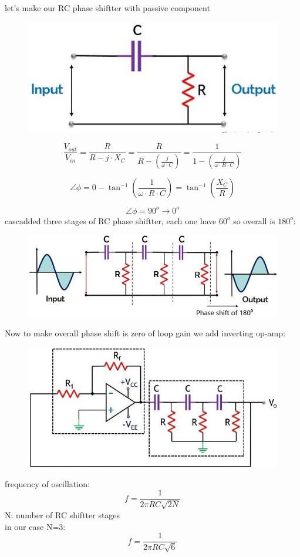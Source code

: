 \documentclass{article}
\begin{document}
let's make our RC phase shiftter with passive component

\begin{figure}[h]
    \centering
    \includegraphics[width=.4\textwidth]{RC_phasse_shift.jpg}
\end{figure}
\[
\frac{V_{out}}{V_{in}} = \frac{R}{R - j \cdot X_C} = \frac{R}{R - \left( \frac{j}{\omega \cdot C} \right)} = \frac{1}{1 - \left( \frac{j}{\omega \cdot R \cdot C} \right)}
\]

\[
    \angle \phi = 0 - \tan ^{-1}(\frac{1}{\omega \cdot R \cdot C}) = \tan ^{-1}(\frac{X_C}{R})
\]

\[
    \angle \phi = 90^o \rightarrow 0^o
\]
cascadded three stages of RC phase shiftter, each one have \(60^o\) so overall is \(180^o\):
\begin{figure}[h]
    \centering
    \includegraphics[width=.7\textwidth]{cascaddedRCPhaseShifter.jpg}
\end{figure}

Now to make overall phase shift is zero of loop gain we add inverting op-amp:
\begin{figure}[h]
    \centering
    \includegraphics[width=.6\textwidth]{RC-phase-shift _oscillator-circuit.jpg}
\end{figure}

frequency of oscillation:
\[
\boxed{f=\frac{1}{2\pi RC\sqrt{2N}}}
\]
N: number of RC shiftter stages\\
in our case N=3:
\[
\boxed{f=\frac{1}{2\pi RC\sqrt{6}}}
\]
\end{document}

